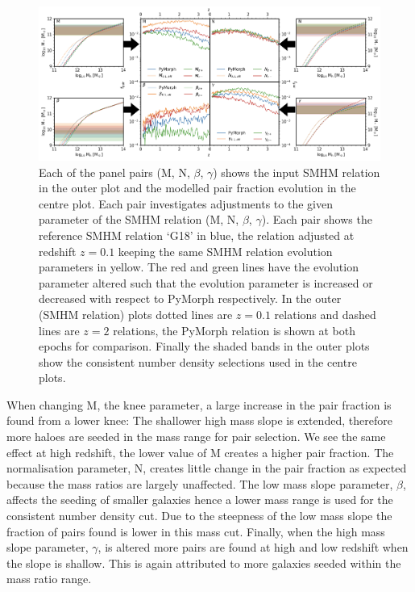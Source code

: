 \begin{landscape}
\begingroup
\begin{figure}[h]
	\centering
	\includegraphics[width = \linewidth]{Figures/Chapter5/PairFractionSystematic.png}
	\caption{Each of the panel pairs (M, N, $\beta$, $\gamma$) shows the input SMHM relation in the outer plot and the modelled pair fraction evolution in the centre plot. Each pair investigates adjustments to the given parameter of the SMHM relation (M, N, $\beta$, $\gamma$). Each pair shows the reference SMHM relation `G18' in blue, the relation adjusted at redshift $z = 0.1$ keeping the same SMHM relation evolution parameters in yellow. The red and green lines have the evolution parameter altered such that the evolution parameter is increased or decreased with respect to PyMorph respectively. In the outer (SMHM relation) plots dotted lines are $z = 0.1$ relations and dashed lines are $z = 2$ relations, the PyMorph relation is shown at both epochs for comparison. Finally the shaded bands in the outer plots show the consistent number density selections used in the centre plots.}
	\label{fig:PairFracSystematic}
\end{figure}
\endgroup
\end{landscape}

When changing M, the knee parameter, a large increase in the pair fraction is found from a lower knee: The shallower high mass slope is extended, therefore more haloes are seeded in the mass range for pair selection. 
We see the same effect at high redshift, the lower value of M creates a higher pair fraction. 
The normalisation parameter, N, creates little change in the pair fraction as expected because the mass ratios are largely unaffected. 
The low mass slope parameter, $\beta$, affects the seeding of smaller galaxies hence a lower mass range is used for the consistent number density cut. 
Due to the steepness of the low mass slope the fraction of pairs found is lower in this mass cut.
Finally, when the high mass slope parameter, $\gamma$, is altered more pairs are found at high and low redshift when the slope is shallow. 
This is again attributed to more galaxies seeded within the mass ratio range.

